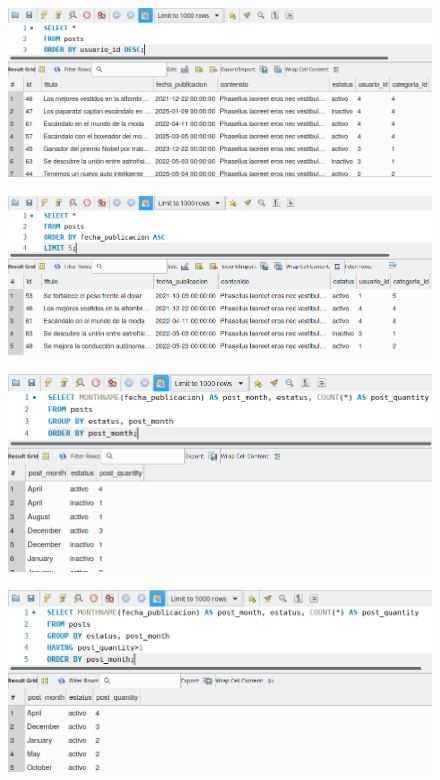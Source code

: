\documentclass{article}
\begin{document}
\begin{figure}[h!]
  \centering
  \includegraphics[scale=0.75]{./Pictures/128_order_by_id_desc.png}
\end{figure}

\begin{figure}[h!]
  \centering
  \includegraphics[scale=0.75]{./Pictures/129_order_by_limit.png}
\end{figure}

\begin{figure}[h!]
  \centering
  \includegraphics[scale=0.75]{./Pictures/131_order_by_month.png}
\end{figure}

\begin{figure}[h!]
  \centering
  \includegraphics[scale=0.75]{./Pictures/132_order_by_month_having.png}
\end{figure}
\end{document}
